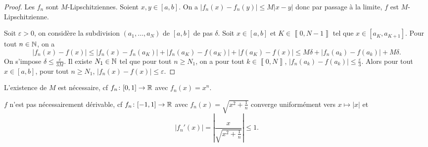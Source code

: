 \documentclass[12pt]{article}
\begin{document}
\begin{proof}
    Les $f_{n}$ sont $M$-Lipschitziennes. Soient $x,y\in[a,b]$. On a $\left\lvert f_{n}(x)-f_{n}(y)\right\rvert\leqslant M\left\lvert x-y\right\rvert$ donc par passage à la limite, $f$ est $M$-Lipschitzienne. 
    
    Soit $\varepsilon>0$, on considère la subdivision $(a_{1},\dots,a_{N})$ de $[a,b]$ de pas $\delta$. Soit $x\in[a,b]$ et $K\in\left\llbracket0,N-1\right\rrbracket$ tel que $x\in[a_{K},a_{K+1}]$. Pour tout $n\in\mathbb{N}$, on a 
    \begin{equation}
        \left\lvert f_{n}(x)-f(x)\right\rvert\leqslant\left\lvert f_{n}(x)-f_{n}(a_{K})\right\rvert+\left\lvert f_{n}(a_{K})-f(a_{K})\right\rvert+\left\lvert f(a_{K})-f(x)\right\rvert\leqslant M\delta+\left\lvert f_{n}(a_{k})-f(a_{k})\right\rvert+M\delta.
    \end{equation}
    On s'impose $\delta\leqslant\frac{\varepsilon}{3M}$. Il existe $N_{1}\in\mathbb{N}$ tel que pour tout $n\geqslant N_{1}$, on a pour tout $k\in\left\llbracket0,N\right\rrbracket$, $\left\lvert f_{n}(a_{k})-f(a_{k})\right\rvert\leqslant\frac{\varepsilon}{3}$. Alors pour tout $x\in[a,b]$, pour tout $n\geqslant N_{1}$, $\left\lvert f_{n}(x)-f(x)\right\rvert\leqslant\varepsilon$.
\end{proof}

\begin{remark}
    L'existence de $M$ est nécessaire, cf $f_{n}\colon[0,1]\to\mathbb{R}$ avec $f_n(x)=x^{n}$.
\end{remark}

\begin{remark}
    $f$ n'est pas nécessairement dérivable, cf $f_{n}\colon[-1,1]\to\mathbb{R}$ avec $f_n(x)=\sqrt{x^{2}+\frac{1}{n}}$ converge uniformément vers $x\mapsto\left\lvert x\right\rvert$ et 
    \begin{equation}
        \left\lvert f_n'(x)\right\rvert=\left\lvert\frac{x}{\sqrt{x^{2}+\frac{1}{n}}}\right\rvert\leqslant1.
    \end{equation}
\end{remark}
\end{document}
